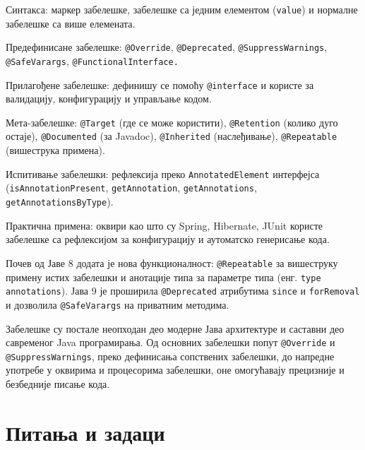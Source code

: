 Синтакса: маркер забелешке, забелешке са једним елементом (\texttt{value}) и нормалне забелешке са више елемената.

Предефинисане забелешке: \texttt{@Override}, \texttt{@Deprecated}, \texttt{@SuppressWarnings}, \texttt{@SafeVarargs}, \texttt{@FunctionalInterface.}

Прилагођене забелешке: дефинишу се помоћу \texttt{@interface} и користе за валидацију, конфигурацију и управљање кодом.

Мета-забелешке: \texttt{@Target} (где се може користити), \texttt{@Retention} (колико дуго остаје), \texttt{@Documented} (за Javadoc), \texttt{@Inherited} (наслеђивање), \texttt{@Repeatable} (вишеструка примена).

Испитивање забелешки: рефлексија преко \texttt{AnnotatedElement} интерфејса (\texttt{isAnnotationPresent}, \texttt{getAnnotation}, \texttt{getAnnotations}, \texttt{getAnnotationsByType}).

Практична примена: оквири као што су Spring, Hibernate, JUnit користе забелешке са рефлексијом за конфигурацију и аутоматско генерисање кода.


Почев од Јаве 8 додата је нова функционалност: \texttt{@Repeatable} за вишеструку примену истих забелешки и анотације типа за параметре типа (енг. \texttt{type} \texttt{annotations}). Јава 9 је проширила \texttt{@Deprecated} атрибутима \texttt{since} и \texttt{forRemoval} и дозволила \texttt{@SafeVarargs} на приватним методима.

Забелешке су постале неопходан део модерне Јава архитектуре и саставни део савременог Java програмирања. Од основних забелешки попут \texttt{@Override} и \texttt{@SuppressWarnings}, преко дефинисања сопствених забелешки, до напредне употребе у оквирима и процесорима забелешки, оне омогућавају прецизније и безбедније писање кода.

\section{Питања и задаци}

